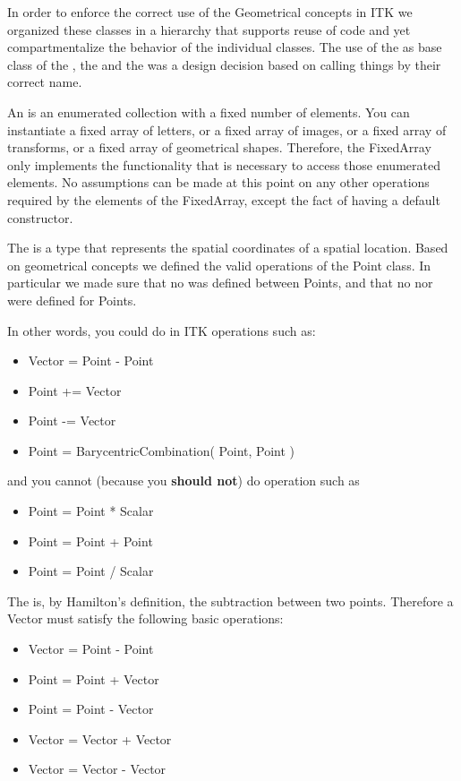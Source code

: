 In order to enforce the correct use of the Geometrical concepts in ITK we
organized these classes in a hierarchy that supports reuse of code and yet
compartmentalize the behavior of the individual classes.  The use of the
 as base class of the , the 
and the  was a design decision based on calling things
by their correct name.

An  is an enumerated collection with a fixed number of
elements. You can instantiate a fixed array of letters, or a fixed array of
images, or a fixed array of transforms, or a fixed array of geometrical shapes.
Therefore, the FixedArray only implements the functionality that is necessary to
access those enumerated elements. No assumptions can be made at this point on
any other operations required by the elements of the FixedArray, except the
fact of having a default constructor.

The  is a type that represents the spatial coordinates of a
spatial location. Based on geometrical concepts we defined the valid operations
of the Point class. In particular we made sure that no  was
defined between Points, and that no  nor
 were defined for Points.

In other words, you could do in ITK operations such as:

\begin{itemize}
\item Vector  = Point - Point
\item Point  +=  Vector
\item Point  -=  Vector
\item Point  = BarycentricCombination( Point, Point )
\end{itemize}

and you cannot (because you \textbf{should not}) do operation such as

\begin{itemize}
\item Point = Point * Scalar    
\item Point = Point + Point    
\item Point = Point / Scalar  
\end{itemize}

The  is, by Hamilton's definition, the subtraction between two
points. Therefore a Vector must satisfy the following basic operations:

\begin{itemize}
\item Vector = Point - Point
\item Point  = Point + Vector
\item Point  = Point - Vector
\item Vector = Vector + Vector
\item Vector = Vector - Vector
\end{itemize}

